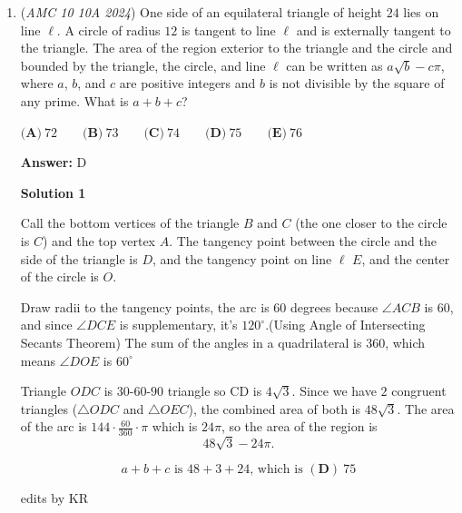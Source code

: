 \begin{enumerate}
\textbf{Solution 4 (Quick With Reasoning)}

Alright so realize that obviously rotation and dilation are commute, if you ever looked at the polar plane. Also, reflecting around the x-axis means that moving to the right two units and dilating are commute. You can easily see this by taking an arbitrary point and applying the transformations. The rest don’t work since you can easily test out using random points on the plane, which means the answer is $\boxed{\textbf{(C) }3}$.

 


	\item (\textit{AMC 10 10A 2024}) One side of an equilateral triangle of height $24$ lies on line $\ell$. A circle of radius $12$ is tangent to line $\ell$ and is externally tangent to the triangle. The area of the region exterior to the triangle and the circle and bounded by the triangle, the circle, and line $\ell$ can be written as $a \sqrt{b} - c \pi$, where $a$, $b$, and $c$ are positive integers and $b$ is not divisible by the square of any prime. What is $a + b + c$?  


 $\textbf{(A)}~72\qquad\textbf{(B)}~73\qquad\textbf{(C)}~74\qquad\textbf{(D)}~75\qquad\textbf{(E)}~76$

 \textbf{Answer: }D



\textbf{Solution 1}

Call the bottom vertices of the triangle $B$ and $C$ (the one closer to the circle is $C$) and the top vertex $A$. The tangency point between the circle and the side of the triangle is $D$, and the tangency point on line $\ell$ $E$, and the center of the circle is $O$.

 
Draw radii to the tangency points, the arc is $60$ degrees because $\angle ACB$ is $60$, and since $\angle DCE$ is supplementary, it's $120^{\circ}$.(Using Angle of Intersecting Secants Theorem) The sum of the angles in a quadrilateral is $360$, which means $\angle DOE$ is $60^{\circ}$

 
Triangle $ODC$ is $30$-$60$-$90$ triangle so CD is $4\sqrt{3}$. Since we have $2$ congruent triangles ($\triangle ODC$ and $\triangle OEC$), the combined area of both is $48\sqrt{3}$.  The area of the arc is $144 \cdot \frac{60}{360} \cdot \pi$ which is $24\pi$, so the area of the region is 
 \[48\sqrt{3}-24\pi.\]

 \[a+b+c \text{ is } 48+3+24 \text{, which is } \boxed{\mathbf{(D)}~75}\]

 edits by KR


\end{enumerate}
